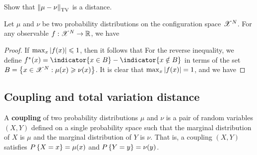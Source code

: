 \documentclass[letterpaper,english,10pt]{article}
\begin{document}
\begin{exerc}
Show that $\left\lVert\mu-\nu\right\rVert_{\text{TV}}$ is a distance.  
\end{exerc}
\begin{prop}
Let $\mu$ and $\nu$ be two probability distributions on the configuration space $\mathscr{X}^N$. 
For any observable $f: \mathscr{X}^N \to \mathbb{R}$, we have 
\end{prop}
\begin{proof}
If $\max_x\left\lvert f(x)\right\rvert \leqslant 1$, then it follows that 
For the reverse inequality, we define $f^{\ast}(x) = \indicator{x \in B}-\indicator{x \notin B}$ in terms of the set $B = \left\{x \in \mathscr{X}^N: \mu(x) \geqslant \nu(x)\right\}$. 
It is clear that $\max_x\left\lvert f(x)\right\rvert = 1$, and we have 
\end{proof}
\subsection{Coupling and total variation distance}
\begin{defn}
A \textbf{coupling} of two probability distributions $\mu$ and $\nu$ is a pair of random variables $(X, Y)$ 
defined on a single probability space such that the marginal distribution of $X$ is $\mu$ and the marginal distribution of $Y$ is $\nu$. 
That is, a coupling $(X, Y)$ satisfies $P\left\{X = x\right\} = \mu(x)$ and $P\left\{Y = y\right\} = \nu(y)$. 
\end{defn}
\end{document}
